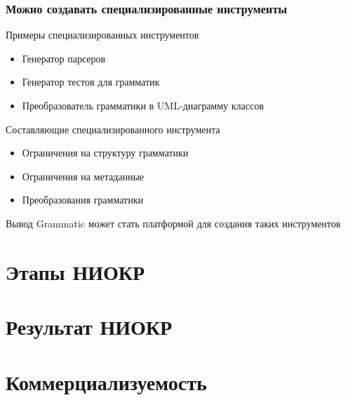 \documentclass[paper=screen,10pt,unicode]{beamer}
\begin{document}
\begin{frame}
	\frametitle{Можно создавать специализированные инструменты}

	\begin{block}{Примеры специализированных инструментов}
		\begin{itemize}
			\item Генератор парсеров
			\item Генератор тестов для грамматик
			\item Преобразователь грамматики в UML-диаграмму классов
		\end{itemize}
	\end{block}
	\begin{block}{Составляющие специализированного инструмента}
		\begin{itemize}
			\item Ограничения на структуру грамматики
			\item Ограничения на метаданные
			\item Преобразования грамматики
		\end{itemize}
	\end{block}
	\begin{block}{Вывод}
		Grammatic может стать платформой для создания таких инструментов
	\end{block}
\end{frame}

\section{Этапы НИОКР}
\section{Результат НИОКР}
\section{Коммерциализуемость}
\end{document}

